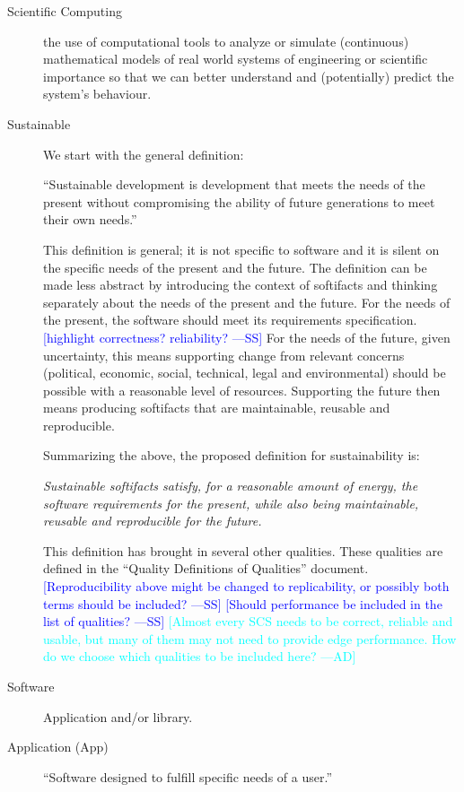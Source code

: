 \documentclass[12pt]{article}
\newcommand{\authornote}[3]{\textcolor{#1}{[#3 ---#2]}}
\newcommand{\authornote}[3]{}
\newcommand{\wss}[1]{\authornote{blue}{SS}{#1}} %
\newcommand{\ad}[1]{\authornote{cyan}{AD}{#1}} %
\begin{document}
\begin{description}
\item[Scientific Computing] the use of computational tools to analyze or
  simulate (continuous) mathematical models of real world systems of engineering
  or scientific importance so that we can better understand and (potentially)
  predict the system's behaviour. \citep{SmithAndLai2005}
\item[Sustainable] We start with the general definition:

``Sustainable development is development that meets the needs
  of the present without compromising the ability of future generations to meet
  their own needs.'' \citep{Brundtland1987}

  This definition is general; it is not specific to software and it is silent on
  the specific needs of the present and the future.  The definition can be made
  less abstract by introducing the context of softifacts and thinking
  separately about the needs of the present and the future.  For the needs of
  the present, the software should meet its requirements specification.
  \wss{highlight correctness? reliability?}  For the
  needs of the future, given uncertainty, this means supporting change from
  relevant concerns (political, economic, social, technical, legal and
  environmental) should be possible with a reasonable level of resources.
  Supporting the future then means producing softifacts that are
  maintainable, reusable and reproducible.  

  Summarizing the above, the proposed definition for sustainability is:

  \emph{Sustainable softifacts satisfy, for a reasonable amount of energy, the
    software requirements for the present, while also being maintainable,
    reusable and reproducible for the future.}

This definition has brought in several other qualities.  These qualities are
defined in the ``Quality  Definitions of Qualities'' document.
\wss{Reproducibility above might be changed to replicability, or possibly both
  terms should be included?}
\wss{Should performance be included in the list of qualities?}
\ad{Almost every SCS needs to be correct, reliable and usable, but many of them
may not need to provide edge performance. How do we choose which qualities to be
included here?}

\item[Software] Application and/or library.
\item[Application (App)] ``Software designed to fulfill specific needs of a
  user.'' \citep{IEEEStdGlossarySET1990}


\end{description}
\end{document}
